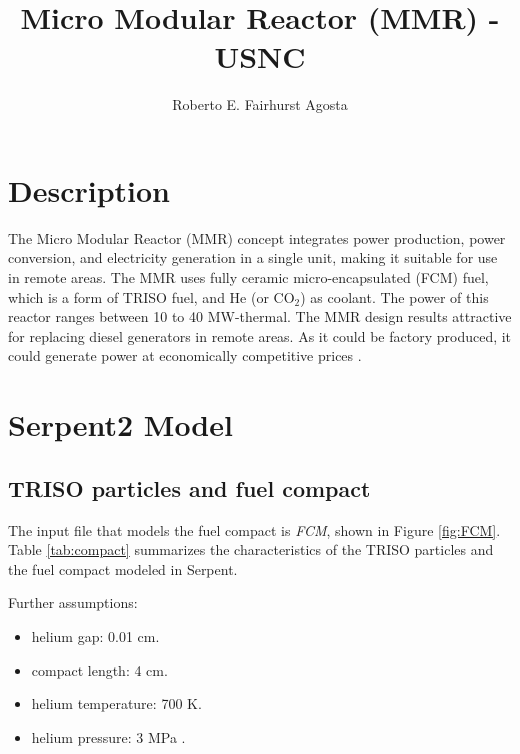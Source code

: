 \documentclass[11pt,letterpaper]{article}
\title{Micro Modular Reactor (MMR) - USNC}
\author{Roberto E. Fairhurst Agosta}
\begin{document}

\section{Description}

The Micro Modular Reactor (MMR) concept integrates power production, power conversion, and electricity generation in a single unit, making it suitable for use in remote areas. 
The MMR uses fully ceramic micro-encapsulated (FCM) fuel, which is a form of TRISO fuel, and He (or CO$_2$) as coolant.
The power of this reactor ranges between 10 to 40 MW-thermal.
The MMR design results attractive for replacing diesel generators in remote areas.
As it could be factory produced, it could generate power at economically competitive prices \cite{hawari_development_2018}.

\section{Serpent2 Model}

\subsection{TRISO particles and fuel compact}

The input file that models the fuel compact is \textit{FCM}, shown in Figure \ref{fig:FCM}.
Table \ref{tab:compact} summarizes the characteristics of the TRISO particles and the fuel compact modeled in Serpent.

Further assumptions:
\begin{itemize}
	\item helium gap: 0.01 cm.
	\item compact length: 4 cm.
	\item helium temperature: 700 K.
	\item helium pressure: 3 MPa \cite{hawari_development_2018}.
\end{itemize}
\end{document}
